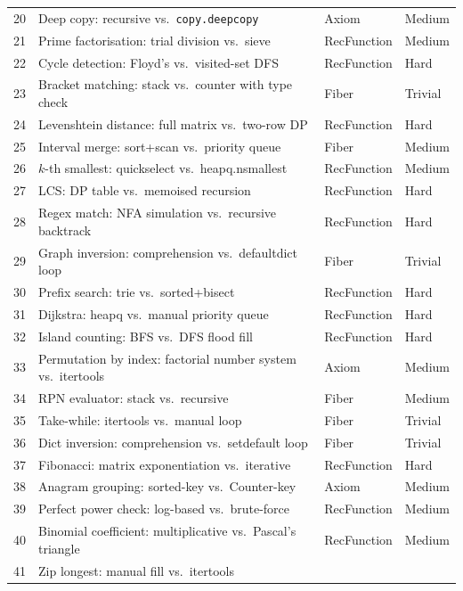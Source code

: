 \begin{center}
\begin{tabular}{r p{5.5cm} l l}
  20 & Deep copy: recursive vs.\ \texttt{copy.deepcopy}
     & Axiom & Medium \\
  21 & Prime factorisation: trial division vs.\ sieve
     & RecFunction & Medium \\
  22 & Cycle detection: Floyd's vs.\ visited-set DFS
     & RecFunction & Hard \\
  23 & Bracket matching: stack vs.\ counter with type check
     & Fiber & Trivial \\
  24 & Levenshtein distance: full matrix vs.\ two-row DP
     & RecFunction & Hard \\
  25 & Interval merge: sort+scan vs.\ priority queue
     & Fiber & Medium \\
  26 & $k$-th smallest: quickselect vs.\ heapq.nsmallest
     & RecFunction & Medium \\
  27 & LCS: DP table vs.\ memoised recursion
     & RecFunction & Hard \\
  28 & Regex match: NFA simulation vs.\ recursive backtrack
     & RecFunction & Hard \\
  29 & Graph inversion: comprehension vs.\ defaultdict loop
     & Fiber & Trivial \\
  30 & Prefix search: trie vs.\ sorted+bisect
     & RecFunction & Hard \\
  31 & Dijkstra: heapq vs.\ manual priority queue
     & RecFunction & Hard \\
  32 & Island counting: BFS vs.\ DFS flood fill
     & RecFunction & Hard \\
  33 & Permutation by index: factorial number system vs.\ itertools
     & Axiom & Medium \\
  34 & RPN evaluator: stack vs.\ recursive
     & Fiber & Medium \\
  35 & Take-while: itertools vs.\ manual loop
     & Fiber & Trivial \\
  36 & Dict inversion: comprehension vs.\ setdefault loop
     & Fiber & Trivial \\
  37 & Fibonacci: matrix exponentiation vs.\ iterative
     & RecFunction & Hard \\
  38 & Anagram grouping: sorted-key vs.\ Counter-key
     & Axiom & Medium \\
  39 & Perfect power check: log-based vs.\ brute-force
     & RecFunction & Medium \\
  40 & Binomial coefficient: multiplicative vs.\ Pascal's triangle
     & RecFunction & Medium \\
  41 & Zip longest: manual fill vs.\ itertools

\end{tabular}
\end{center}
